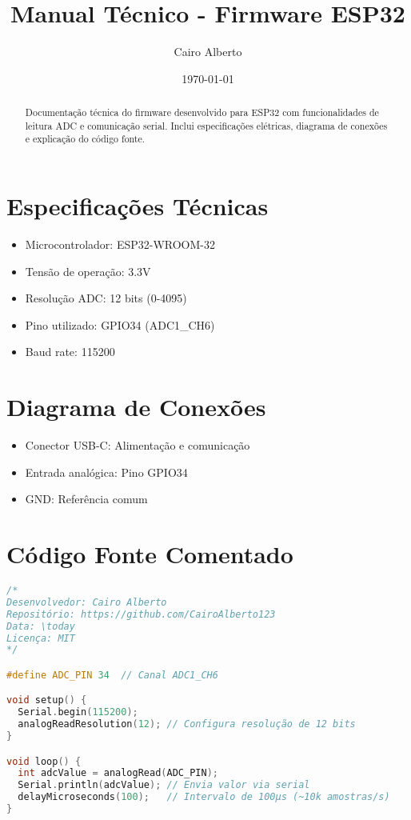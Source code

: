 \documentclass[12pt,a4paper]{article}
\title{Manual Técnico - Firmware ESP32}
\author{Cairo Alberto}
\date{\today}
\begin{document}
\maketitle

\begin{abstract}
Documentação técnica do firmware desenvolvido para ESP32 com funcionalidades de leitura ADC e comunicação serial. Inclui especificações elétricas, diagrama de conexões e explicação do código fonte.
\end{abstract}

\section{Especificações Técnicas}
\begin{itemize}
\item Microcontrolador: ESP32-WROOM-32
\item Tensão de operação: 3.3V
\item Resolução ADC: 12 bits (0-4095)
\item Pino utilizado: GPIO34 (ADC1\_CH6)
\item Baud rate: 115200
\end{itemize}

\section{Diagrama de Conexões}
\begin{itemize}
\item Conector USB-C: Alimentação e comunicação
\item Entrada analógica: Pino GPIO34
\item GND: Referência comum
\end{itemize}

\section{Código Fonte Comentado}
\lstset{style=mystyle}
\begin{lstlisting}[language=C++, caption=Firmware principal (adc\_reader.ino)]
/*
Desenvolvedor: Cairo Alberto
Repositório: https://github.com/CairoAlberto123
Data: \today
Licença: MIT
*/

#define ADC_PIN 34  // Canal ADC1_CH6

void setup() {
  Serial.begin(115200);
  analogReadResolution(12); // Configura resolução de 12 bits
}

void loop() {
  int adcValue = analogRead(ADC_PIN);
  Serial.println(adcValue); // Envia valor via serial
  delayMicroseconds(100);   // Intervalo de 100µs (~10k amostras/s)
}
\end{lstlisting}
\end{document}
